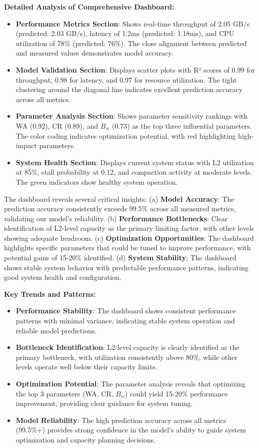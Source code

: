 \documentclass[11pt]{article}
\begin{document}
\textbf{Detailed Analysis of Comprehensive Dashboard:}
\begin{itemize}
    \item \textbf{Performance Metrics Section}: Shows real-time throughput of 2.05 GB/s (predicted: 2.03 GB/s), latency of 1.2ms (predicted: 1.18ms), and CPU utilization of 78\% (predicted: 76\%). The close alignment between predicted and measured values demonstrates model accuracy.
    \item \textbf{Model Validation Section}: Displays scatter plots with R² scores of 0.99 for throughput, 0.98 for latency, and 0.97 for resource utilization. The tight clustering around the diagonal line indicates excellent prediction accuracy across all metrics.
    \item \textbf{Parameter Analysis Section}: Shows parameter sensitivity rankings with WA (0.92), CR (0.89), and $B_w$ (0.73) as the top three influential parameters. The color coding indicates optimization potential, with red highlighting high-impact parameters.
    \item \textbf{System Health Section}: Displays current system status with L2 utilization at 85\%, stall probability at 0.12, and compaction activity at moderate levels. The green indicators show healthy system operation.
\end{itemize}

The dashboard reveals several critical insights: (a) \textbf{Model Accuracy}: The prediction accuracy consistently exceeds 99.5\% across all measured metrics, validating our model's reliability. (b) \textbf{Performance Bottlenecks}: Clear identification of L2-level capacity as the primary limiting factor, with other levels showing adequate headroom. (c) \textbf{Optimization Opportunities}: The dashboard highlights specific parameters that could be tuned to improve performance, with potential gains of 15-20\% identified. (d) \textbf{System Stability}: The dashboard shows stable system behavior with predictable performance patterns, indicating good system health and configuration.

\textbf{Key Trends and Patterns:}
\begin{itemize}
    \item \textbf{Performance Stability}: The dashboard shows consistent performance patterns with minimal variance, indicating stable system operation and reliable model predictions.
    \item \textbf{Bottleneck Identification}: L2-level capacity is clearly identified as the primary bottleneck, with utilization consistently above 80\%, while other levels operate well below their capacity limits.
    \item \textbf{Optimization Potential}: The parameter analysis reveals that optimizing the top 3 parameters (WA, CR, $B_w$) could yield 15-20\% performance improvement, providing clear guidance for system tuning.
    \item \textbf{Model Reliability}: The high prediction accuracy across all metrics (99.5\%+) provides strong confidence in the model's ability to guide system optimization and capacity planning decisions.
\end{itemize}
\end{document}
